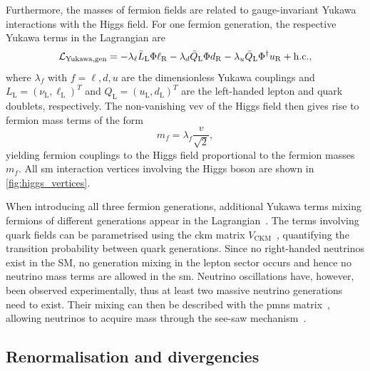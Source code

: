 Furthermore, the masses of fermion fields are related to gauge-invariant Yukawa interactions with the Higgs field. For one fermion generation, the respective Yukawa terms in the Lagrangian are
\begin{equation}
	\mathcal{L}_\mathrm{Yukawa,gen} = - \lambda_\ell \bar{L}_\mathrm{L}\Phi\ell_\mathrm{R} - \lambda_d \bar{Q}_\mathrm{L}\Phi d_\mathrm{R} - \lambda_u \bar{Q}_\mathrm{L} \Phi^\dagger u_\mathrm{R} + \mathrm{h.c.},
\end{equation}
where $\lambda_f$ with $f = \ell,d,u$ are the dimensionless Yukawa couplings and $L_\mathrm{L} = (\nu_\mathrm{L},\ell_\mathrm{L})^T$ and $Q_\mathrm{L} = (u_\mathrm{L},d_\mathrm{L})^T$ are the left-handed lepton and quark doublets, respectively. The non-vanishing \gls{vev} of the Higgs field then gives rise to fermion mass terms of the form 
\begin{equation}
 m_f = \lambda_f \frac{v}{\sqrt{2}},
\end{equation}
yielding fermion couplings to the Higgs field proportional to the fermion masses $m_f$. All \gls{sm} interaction vertices involving the Higgs boson are shown in \cref{fig:higgs_vertices}.

When introducing all three fermion generations, additional Yukawa terms mixing fermions of different generations appear in the Lagrangian~\cite{Brock:1354959}. The terms involving quark fields can be parametrised using the \gls{ckm} matrix $V_\mathrm{CKM}$~\cite{PhysRevLett.10.531,CKM:1973fv}, quantifying the transition probability between quark generations. Since no right-handed neutrinos exist in the SM, no generation mixing in the lepton sector occurs and hence no neutrino mass terms are allowed in the \gls{sm}. Neutrino oscillations have, however, been observed experimentally, thus at least two massive neutrino generations need to exist. Their mixing can then be described with the \gls{pmns} matrix~\cite{PMNS:1962mu}, allowing neutrinos to acquire mass \eg through the see-saw mechanism~\cite{Brdar:2019iem}.
 
\subsection{Renormalisation and divergencies}
\label{ch:renormalisation}

